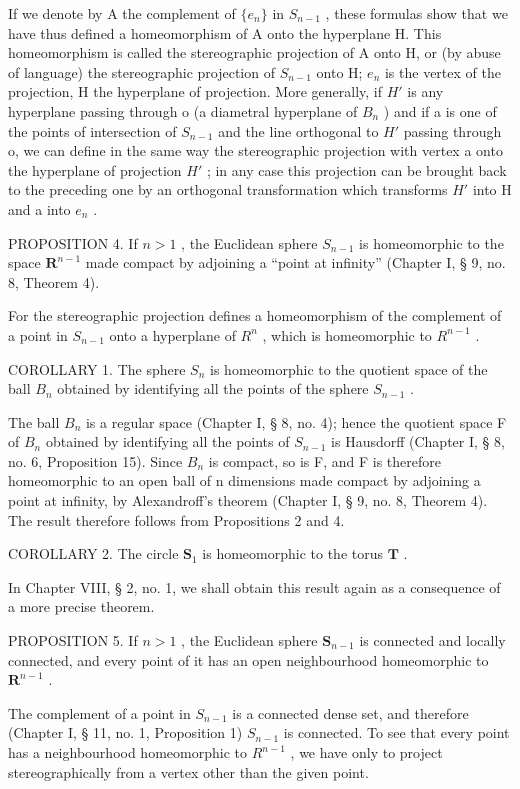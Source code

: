 If we denote by A the complement of \(\{e_{n}\}\) in \(S_{n-1}\) , these formulas show that we have thus defined a homeomorphism of A onto the hyperplane H. This homeomorphism is called the stereographic projection of A onto H, or (by abuse of language) the stereographic projection of \(S_{n-1}\) onto H; \(e_{n}\) is the vertex of the projection, H the hyperplane of projection. More generally, if \(H'\) is any hyperplane passing through o (a diametral hyperplane of \(B_{n}\) ) and if a is one of the points of intersection of \(S_{n-1}\) and the line orthogonal to \(H'\) passing through o, we can define in the same way the stereographic projection with vertex a onto the hyperplane of projection \(H'\) ; in any case this projection can be brought back to the preceding one by an orthogonal transformation which transforms \(H'\) into H and a into \(e_{n}\) .

PROPOSITION 4. If \(n > 1\) , the Euclidean sphere \(S_{n-1}\) is homeomorphic to the space \(\mathbf{R}^{n-1}\) made compact by adjoining a ``point at infinity'' (Chapter I, § 9, no. 8, Theorem 4).

For the stereographic projection defines a homeomorphism of the complement of a point in \(S_{n-1}\) onto a hyperplane of \(R^{n}\) , which is homeomorphic to \(R^{n-1}\) .

COROLLARY 1. The sphere \(S_{n}\) is homeomorphic to the quotient space of the ball \(B_{n}\) obtained by identifying all the points of the sphere \(S_{n-1}\) .

The ball \(B_{n}\) is a regular space (Chapter I, § 8, no. 4); hence the quotient space F of \(B_{n}\) obtained by identifying all the points of \(S_{n-1}\) is Hausdorff (Chapter I, § 8, no. 6, Proposition 15). Since \(B_{n}\) is compact, so is F, and F is therefore homeomorphic to an open ball of n dimensions made compact by adjoining a point at infinity, by Alexandroff's theorem (Chapter I, § 9, no. 8, Theorem 4). The result therefore follows from Propositions 2 and 4.

COROLLARY 2. The circle \(\mathbf{S}_1\) is homeomorphic to the torus \(\mathbf{T}\) .

In Chapter VIII, § 2, no. 1, we shall obtain this result again as a consequence of a more precise theorem.

PROPOSITION 5. If \(n > 1\) , the Euclidean sphere \(\mathbf{S}_{n-1}\) is connected and locally connected, and every point of it has an open neighbourhood homeomorphic to \(\mathbf{R}^{n-1}\) .

The complement of a point in \(S_{n-1}\) is a connected dense set, and therefore (Chapter I, § 11, no. 1, Proposition 1) \(S_{n-1}\) is connected. To see that every point has a neighbourhood homeomorphic to \(R^{n-1}\) , we have only to project stereographically from a vertex other than the given point.

